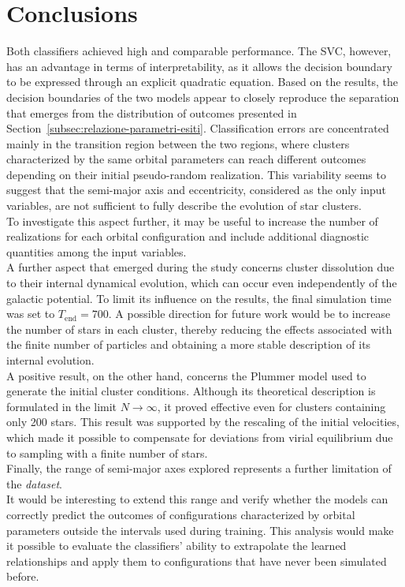 \chapter{Conclusions}
\label{cha:conclusioni}
Both classifiers achieved high and comparable performance. The SVC, however, has an advantage in terms of interpretability, as it allows the decision boundary to be expressed through an explicit quadratic equation. Based on the results, the decision boundaries of the two models appear to closely reproduce the separation that emerges from the distribution of outcomes presented in Section~\ref{subsec:relazione-parametri-esiti}. Classification errors are concentrated mainly in the transition region between the two regions, where clusters characterized by the same orbital parameters can reach different outcomes depending on their initial pseudo-random realization. This variability seems to suggest that the semi-major axis and eccentricity, considered as the only input variables, are not sufficient to fully describe the evolution of star clusters.\\ To investigate this aspect further, it may be useful to increase the number of realizations for each orbital configuration and include additional diagnostic quantities among the input variables.\\
\newline A further aspect that emerged during the study concerns cluster dissolution due to their internal dynamical evolution, which can occur even independently of the galactic potential. To limit its influence on the results, the final simulation time was set to $T_{\mathrm{end}}=700$. A possible direction for future work would be to increase the number of stars in each cluster, thereby reducing the effects associated with the finite number of particles and obtaining a more stable description of its internal evolution.\\
\newline A positive result, on the other hand, concerns the Plummer model used to generate the initial cluster conditions. Although its theoretical description is formulated in the limit $N\to\infty$, it proved effective even for clusters containing only 200 stars. This result was supported by the rescaling of the initial velocities, which made it possible to compensate for deviations from virial equilibrium due to sampling with a finite number of stars.\\
\newline Finally, the range of semi-major axes explored represents a further limitation of the \emph{dataset}.\\ It would be interesting to extend this range and verify whether the models can correctly predict the outcomes of configurations characterized by orbital parameters outside the intervals used during training. This analysis would make it possible to evaluate the classifiers' ability to extrapolate the learned relationships and apply them to configurations that have never been simulated before.%
